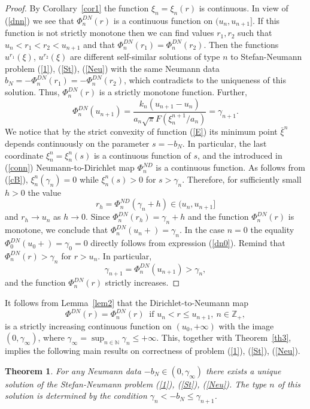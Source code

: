 \documentclass[12pt]{article}
\theoremstyle{plain}
\newtheorem{theorem}{Theorem}[section]
\theoremstyle{definition}
\numberwithin{equation}{section}
\newcommand{\N}{{\mathbb N}}
\newcommand{\Z}{{\mathbb Z}}
\begin{document}
\begin{proof}
By Corollary~\ref{cor1} the function $\xi_n=\xi_n(r)$ is continuous. In view of (\ref{dnn}) we see that $\Phi^{DN}_n(r)$ is a continuous function on $(u_n,u_{n+1}]$. If this function is not strictly monotone then we can find values $r_1,r_2$ such that $u_n<r_1<r_2<u_{n+1}$ and that $\Phi^{DN}_n(r_1)=\Phi^{DN}_n(r_2)$. Then the functions $u^{r_1}(\xi)$, $u^{r_2}(\xi)$ are different self-similar solutions of type $n$ to Stefan-Neumann problem (\ref{1}), (\ref{St}), (\ref{Neu}) with the same Neumann data $b_N=-\Phi^{DN}_n(r_1)=-\Phi^{DN}_n(r_2)$, which contradicts to the uniqueness of this solution. Thus, $\Phi^{DN}_n(r)$ is a strictly monotone function. Further,
\[\Phi^{DN}_n(u_{n+1})=\frac{k_n(u_{n+1}-u_n)}{a_n\sqrt{\pi}F(\xi^{n+1}_n/a_n)}=\gamma_{n+1}.\]
We notice that by the strict convexity of function (\ref{E}) its minimum point $\bar\xi^n$ depends continuously on the parameter $s=-b_N$. In  particular, the last coordinate $\xi_n^n=\xi_n^n(s)$ is a continuous function of $s$, and the introduced in (\ref{conn}) Neumann-to-Dirichlet map $\Phi^{ND}_n$ is a continuous function. As follows from (\ref{cB}),   $\xi_n^n(\gamma_n)=0$ while $\xi_n^n(s)>0$ for $s>\gamma_n$. Therefore, for sufficiently small $h>0$ the value $$r_h=\Phi^{ND}_n(\gamma_n+h)\in (u_n,u_{n+1}]$$ and $r_h\to u_n$ as $h\to 0$. Since $\Phi^{DN}_n(r_h)=\gamma_n+h$ and the function $\Phi^{DN}_n(r)$ is monotone, we conclude that $\Phi^{DN}_n(u_n+)=\gamma_n$. In the case $n=0$ the equality ${\Phi^{DN}_0(u_0+)=\gamma_0=0}$ directly follows from expression (\ref{dn0}). Remind that $\Phi^{DN}_n(r)>\gamma_n$ for $r>u_n$. In particular,
\[\gamma_{n+1}=\Phi^{DN}_n(u_{n+1})>\gamma_n,\] and the function $\Phi^{DN}_n(r)$ strictly increases.
\end{proof}

It follows from Lemma~\ref{lem2} that the Dirichlet-to-Neumann map
\begin{equation}\label{mapDN}
\Phi^{DN}(r)=\Phi^{DN}_n(r) \ \mbox{ if } u_n<r\le u_{n+1}, \ n\in\Z_+,
\end{equation}
is a strictly increasing continuous function on $(u_0,+\infty)$ with the image $(0,\gamma_\infty)$, where
$\gamma_\infty=\sup_{n\in\N}\gamma_n\le +\infty$. This, together with Theorem~\ref{th3}, implies
the following main results on correctness of problem (\ref{1}), (\ref{St}), (\ref{Neu}).

\begin{theorem}\label{th5} For any Neumann data $-b_N\in (0,\gamma_\infty)$ there exists a unique solution of the Stefan-Neumann problem
(\ref{1}), (\ref{St}), (\ref{Neu}). The type $n$ of this solution is determined by the condition $\gamma_n<-b_N\le\gamma_{n+1}$.
\end{theorem}
\end{document}
